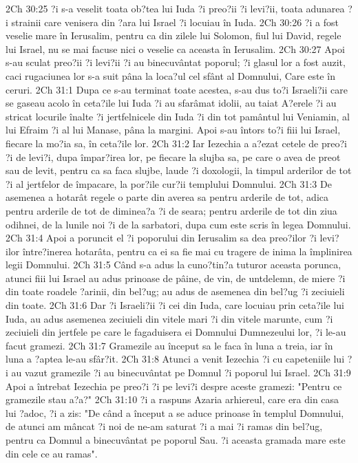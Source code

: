 2Ch 30:25  ?i s-a veselit toata ob?tea lui Iuda ?i preo?ii ?i levi?ii, toata adunarea ?i strainii care venisera din ?ara lui Israel ?i locuiau în Iuda.
2Ch 30:26  ?i a fost veselie mare în Ierusalim, pentru ca din zilele lui Solomon, fiul lui David, regele lui Israel, nu se mai facuse nici o veselie ca aceasta în Ierusalim.
2Ch 30:27  Apoi s-au sculat preo?ii ?i levi?ii ?i au binecuvântat poporul; ?i glasul lor a fost auzit, caci rugaciunea lor s-a suit pâna la loca?ul cel sfânt al Domnului, Care este în ceruri.
2Ch 31:1  Dupa ce s-au terminat toate acestea, s-au dus to?i Israeli?ii care se gaseau acolo în ceta?ile lui Iuda ?i au sfarâmat idolii, au taiat A?erele ?i au stricat locurile înalte ?i jertfelnicele din Iuda ?i din tot pamântul lui Veniamin, al lui Efraim ?i al lui Manase, pâna la margini. Apoi s-au întors to?i fiii lui Israel, fiecare la mo?ia sa, în ceta?ile lor.
2Ch 31:2  Iar Iezechia a a?ezat cetele de preo?i ?i de levi?i, dupa împar?irea lor, pe fiecare la slujba sa, pe care o avea de preot sau de levit, pentru ca sa faca slujbe, laude ?i doxologii, la timpul arderilor de tot ?i al jertfelor de împacare, la por?ile cur?ii templului Domnului.
2Ch 31:3  De asemenea a hotarât regele o parte din averea sa pentru arderile de tot, adica pentru arderile de tot de diminea?a ?i de seara; pentru arderile de tot din ziua odihnei, de la lunile noi ?i de la sarbatori, dupa cum este scris în legea Domnului.
2Ch 31:4  Apoi a poruncit el ?i poporului din Ierusalim sa dea preo?ilor ?i levi?ilor între?inerea hotarâta, pentru ca ei sa fie mai cu tragere de inima la împlinirea legii Domnului.
2Ch 31:5  Când s-a adus la cuno?tin?a tuturor aceasta porunca, atunci fiii lui Israel au adus prinoase de pâine, de vin, de untdelemn, de miere ?i din toate roadele ?arinii, din bel?ug; au adus de asemenea din bel?ug ?i zeciuieli din toate.
2Ch 31:6  Dar ?i Israeli?ii ?i cei din Iuda, care locuiau prin ceta?ile lui Iuda, au adus asemenea zeciuieli din vitele mari ?i din vitele marunte, cum ?i zeciuieli din jertfele pe care le fagaduisera ei Domnului Dumnezeului lor, ?i le-au facut gramezi.
2Ch 31:7  Gramezile au început sa le faca în luna a treia, iar în luna a ?aptea le-au sfâr?it.
2Ch 31:8  Atunci a venit Iezechia ?i cu capeteniile lui ?i au vazut gramezile ?i au binecuvântat pe Domnul ?i poporul lui Israel.
2Ch 31:9  Apoi a întrebat Iezechia pe preo?i ?i pe levi?i despre aceste gramezi: "Pentru ce gramezile stau a?a?"
2Ch 31:10  ?i a raspuns Azaria arhiereul, care era din casa lui ?adoc, ?i a zis: "De când a început a se aduce prinoase în templul Domnului, de atunci am mâncat ?i noi de ne-am saturat ?i a mai ?i ramas din bel?ug, pentru ca Domnul a binecuvântat pe poporul Sau. ?i aceasta gramada mare este din cele ce au ramas".
